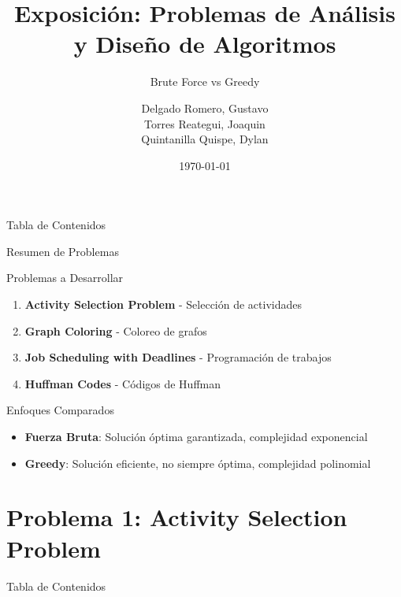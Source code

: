 \documentclass[aspectratio=169]{beamer}
\title[Análisis y Diseño de Algoritmos]{Exposición: Problemas de Análisis y Diseño de Algoritmos}
\subtitle{Brute Force vs Greedy}
\author[Delgado, G. \and Torres, J. \and Quintanilla, D.]{Delgado Romero, Gustavo \\ Torres Reategui, Joaquin \\ Quintanilla Quispe, Dylan}
\institute[UNI]{Universidad Nacional de Ingeniería \\ CC371 - Análisis y Diseño de Algoritmos}
\date{\today}
\begin{document}
\begin{frame}
\titlepage
\end{frame}

\begin{frame}{Tabla de Contenidos}
\tableofcontents[hideallsubsections]
\end{frame}

\begin{frame}{Resumen de Problemas}
\begin{block}{Problemas a Desarrollar}
\begin{enumerate}
\item \textbf{Activity Selection Problem} - Selección de actividades
\item \textbf{Graph Coloring} - Coloreo de grafos
\item \textbf{Job Scheduling with Deadlines} - Programación de trabajos
\item \textbf{Huffman Codes} - Códigos de Huffman
\end{enumerate}
\end{block}

\begin{block}{Enfoques Comparados}
\begin{itemize}
\item \textbf{Fuerza Bruta}: Solución óptima garantizada, complejidad exponencial
\item \textbf{Greedy}: Solución eficiente, no siempre óptima, complejidad polinomial
\end{itemize}
\end{block}
\end{frame}

\section{Problema 1: Activity Selection Problem}

\begin{frame}{Tabla de Contenidos}
\end{frame}
\end{document}

